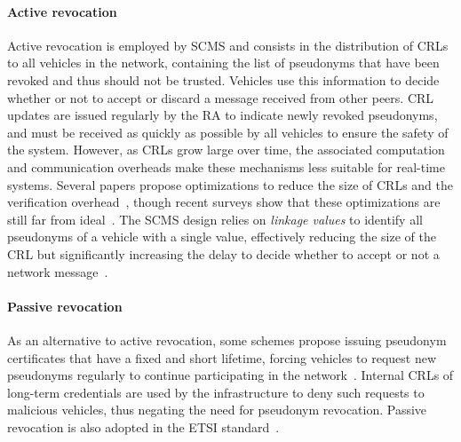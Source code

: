 \paragraph{Active revocation}
%
Active revocation is employed by \ac{SCMS} and consists in the distribution of
\acp{CRL}~\cite{ietfcrl} to all vehicles in the network, containing the list of
pseudonyms that have been revoked and thus should not be trusted. Vehicles use
this information to decide whether or not to accept or discard a message
received from other peers. \ac{CRL} updates are issued regularly by the \ac{RA}
to indicate newly revoked pseudonyms, and must be received as quickly as
possible by all vehicles to ensure the safety of the system. However, as
\acp{CRL} grow large over time, the associated computation and communication
overheads make these mechanisms less suitable for real-time systems. Several
papers propose optimizations to reduce the size of \acp{CRL} and the
verification overhead~\cite{simplicio2019acpc,kumar2017binary}, though recent
surveys show that these optimizations are still far from
ideal~\cite{wang2020certificate,yoshizawa2022v2x_survey}. The \ac{SCMS} design
relies on \emph{linkage values} to identify all pseudonyms of a vehicle with a
single value, effectively reducing the size of the \ac{CRL} but significantly
increasing the delay to decide whether to accept or not a network
message~\cite{brecht2018scms}.

\paragraph{Passive revocation}
%
As an alternative to active revocation, some schemes propose issuing pseudonym
certificates that have a fixed and short lifetime, forcing vehicles to request
new pseudonyms regularly to continue participating in the
network~\cite{hicks2020vehicular,verheul2019ifal,ahmed2017secure}. Internal
\acp{CRL} of long-term credentials are used by the infrastructure to deny such
requests to malicious vehicles, thus negating the need for pseudonym revocation.
Passive revocation is also adopted in the ETSI standard~\cite{etsi2022102941}.

